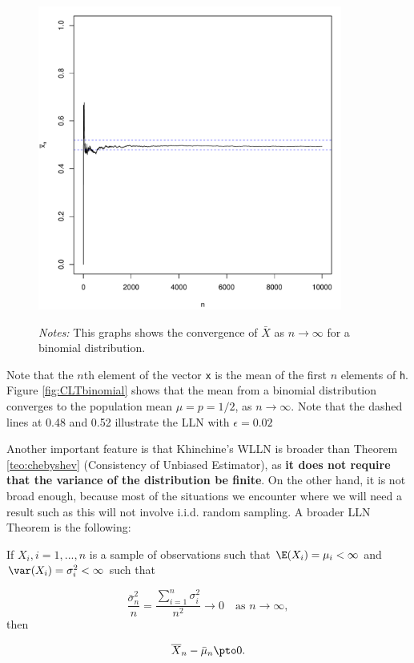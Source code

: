 \documentclass[english,12pt]{book}\usepackage[]{graphicx}\usepackage[]{xcolor}
\newenvironment{knitrout}{}{} %
\begin{document}
\begin{example}
\begin{figure}[H]
\begin{minipage}{.9\linewidth}
\begin{knitrout}
{\centering \includegraphics[width=10cm,height=10cm]{figure/CLT-binomialPlot-1} 

}


\end{knitrout}
\footnotesize
		\emph{Notes:} This graphs shows the convergence of $\bar{X}$ as $n\to\infty$ for a binomial distribution.
	\end{minipage}
\end{figure}

Note that the $n$th element of the vector \texttt{x} is the mean of the first $n$ elements of \texttt{h}. Figure \ref{fig:CLTbinomial} shows that the mean from a binomial distribution converges to the population mean $\mu = p = 1/2$, as $n\to \infty$. Note that the dashed lines at 0.48 and 0.52 illustrate the LLN with $\epsilon = 0.02$
\end{example}


Another important feature is that Khinchine's WLLN  is broader than Theorem \ref{teo:chebyshev} (Consistency of Unbiased Estimator), as \textbf{it does not require that the variance of the distribution be finite}. On the other hand, it is not broad enough, because most of the situations we encounter where we will need a result such as this will not involve i.i.d. random sampling. A broader LLN Theorem is the following:

\begin{theorem}\label{theorem:ChebychevWLLN}
  If $X_i, i = 1,...,n$ is a sample of observations such that $\E(X_i) = \mu_i <\infty$ and $\var(X_i)=\sigma^2_i < \infty$ such that
  
\begin{equation*}
  \frac{\bar{\sigma}^2_n}{n} = \frac{\sum_{i = 1}^n\sigma_i^2}{n^2}\to 0\quad \mbox{as $n\to\infty$},
\end{equation*}
%
then

\begin{equation*}
  \overline{X}_n - \bar{\mu}_n \pto 0.
\end{equation*}
\end{theorem}
\end{document}
